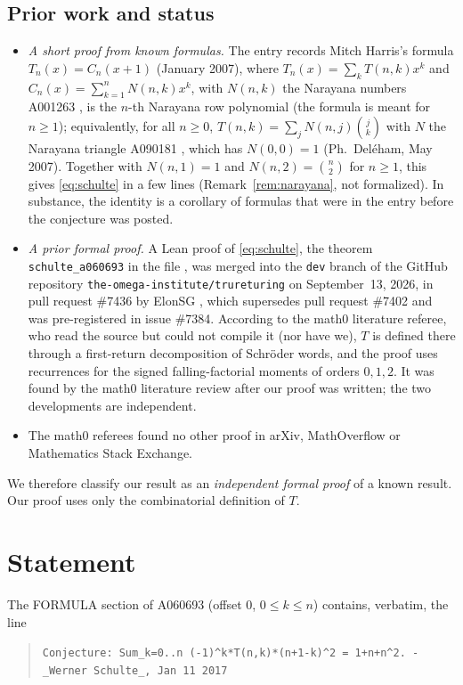 \documentclass[11pt]{amsart}
\theoremstyle{plain}
\theoremstyle{definition}
\newcommand{\lb}{\char123}
\newcommand{\rb}{\char125}
\begin{document}
\subsection*{Prior work and status}
\begin{itemize}
\item \emph{A short proof from known formulas.} The entry records Mitch Harris's formula $T_n(x)=C_n(x+1)$ (January 2007), where $T_n(x)=\sum_kT(n,k)x^k$ and $C_n(x)=\sum_{k=1}^{n}N(n,k)x^k$, with $N(n,k)$ the Narayana numbers A001263 \cite{A001263}, is the $n$-th Narayana row polynomial (the formula is meant for $n\ge1$); equivalently, for all $n\ge0$, $T(n,k)=\sum_j N(n,j)\binom jk$ with $N$ the Narayana triangle A090181 \cite{A090181}, which has $N(0,0)=1$ (Ph.~Deléham, May 2007). Together with $N(n,1)=1$ and $N(n,2)=\binom n2$ for $n\ge1$, this gives \eqref{eq:schulte} in a few lines (Remark~\ref{rem:narayana}, not formalized). In substance, the identity is a corollary of formulas that were in the entry before the conjecture was posted.
\item \emph{A prior formal proof.} A Lean proof of \eqref{eq:schulte}, the theorem \texttt{schulte\_a060693} in the file , was merged into the \texttt{dev} branch of the GitHub repository \texttt{the-omega-institute/trureturing} on September~13, 2026, in pull request \#7436 by ElonSG \cite{TRU}, which supersedes pull request \#7402 and was pre-registered in issue \#7384. According to the math0 literature referee, who read the source but could not compile it (nor have we), $T$ is defined there through a first-return decomposition of Schr\"oder words, and the proof uses recurrences for the signed falling-factorial moments of orders $0,1,2$. It was found by the math0 literature review after our proof was written; the two developments are independent.
\item The math0 referees found no other proof in arXiv, MathOverflow or Mathematics Stack Exchange.
\end{itemize}
We therefore classify our result as an \emph{independent formal proof} of a known result. Our proof uses only the combinatorial definition of $T$.

\section{Statement}\label{sec:statement}

The FORMULA section of A060693 \cite{A060693} (offset $0$, $0\le k\le n$) contains, verbatim, the line
\begin{quote}\raggedright
\texttt{Conjecture: Sum\_\lb k=0..n\rb\ (-1)\^{}k*T(n,k)*(n+1-k)\^{}2 = 1+n+n\^{}2. - \_Werner Schulte\_, Jan 11 2017}
\end{quote}
\end{document}
